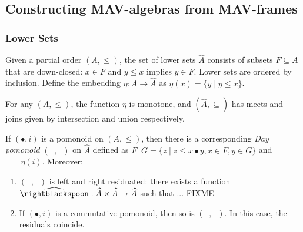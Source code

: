 \begin{proposition}
\end{proposition}

\subsection{Constructing MAV-algebras from MAV-frames}

\newcommand{\LowerSet}[1]{\widehat{#1}}
\newcommand{\Day}[1]{\mathop{\widehat{#1}}}



\subsubsection{Lower Sets}

\begin{definition}
  Given a partial order $(A, \leq)$, the set of lower sets
  $\LowerSet{A}$ consists of subsets $F \subseteq A$ that are
  down-closed: $x \in F$ and $y \leq x$ implies $y \in F$. Lower sets
  are ordered by inclusion. Define the embedding
  $\eta : A \to \LowerSet{A}$ as $\eta(x) = \{ y \mid y \leq x \}$.
\end{definition}

\begin{proposition}
  For any $(A, \leq)$, the function $\eta$ is monotone, and
  $(\LowerSet{A}, \subseteq)$ has meets and joins given by
  intersection and union respectively.

\end{proposition}

\begin{proposition}\label{prop:day-construction}
  If $(\bullet, i)$ is a pomonoid on $(A, \leq)$, then there is a
  corresponding \emph{Day pomonoid} $(\Day{\bullet}, \Day{i})$ on
  $\LowerSet{A}$ defined as
  $F \Day\bullet G = \{ z \mid z \leq x \bullet y, x \in F, y \in G
  \}$ and $\Day{i} = \eta(i)$. Moreover:
  \begin{enumerate}
  \item $(\Day{\bullet}, \Day{i})$ is left and right residuated: there
    exists a function
    $\Day{\rightblackspoon} : \LowerSet{A} \times \LowerSet{A} \to
    \LowerSet{A}$ such that ... FIXME
  \item If $(\bullet, i)$ is a commutative pomonoid, then so is
    $(\Day{\bullet}, \Day{i})$. In this case, the residuals coincide.
  \end{enumerate}
\end{proposition}

